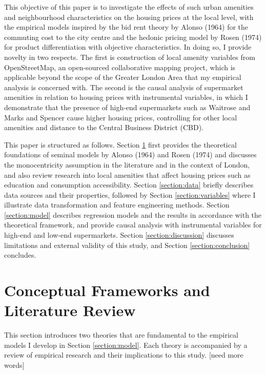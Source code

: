 \documentclass{article}
\begin{document}
This objective of this paper is to investigate the effects of such urban amenities and neighbourhood characteristics on the housing prices at the local level, with the empirical models inspired by the bid rent theory by Alonso (1964) for the commuting cost to the city centre and the hedonic pricing model by Rosen (1974) for product differentiation with objective characteristics. In doing so, I provide novelty in two respects. The first is construction of local amenity variables from OpenStreetMap, an open-sourced collaborative mapping project, which is applicable beyond the scope of the Greater London Area that my empirical analysis is concerned with. The second is the causal analysis of supermarket amenities in relation to housing prices with instrumental variables, in which I demonstrate that the presence of high-end supermarkets such as Waitrose and Marks and Spencer cause higher housing prices, controlling for other local amenities and distance to the Central Business District (CBD).

This paper is structured as follows. Section \ref{section:lit} first provides the theoretical foundations of seminal models by Alonso (1964) and Rosen (1974) and discusses the monocentricity assumption in the literature and in the context of London, and also review research into local amenities that affect housing prices such as education and consumption accessibility. Section \ref{section:data} briefly describes data sources and their properties, followed by Section \ref{section:variables} where I illustrate data transformation and feature engineering methods. Section \ref{section:model} describes regression models and the results in accordance with the theoretical framework, and provide causal analysis with instrumental variables for high-end and low-end supermarkets. Section \ref{section:discussion} discusses limitations and external validity of this study, and Section \ref{section:conclusion} concludes.


\section{Conceptual Frameworks and Literature Review} \label{section:lit}
This section introduces two theories that are fundamental to the empirical models I develop in Section \ref{section:model}. Each theory is accompanied by a review of empirical research and their implications to this study. [need more words]
\end{document}

